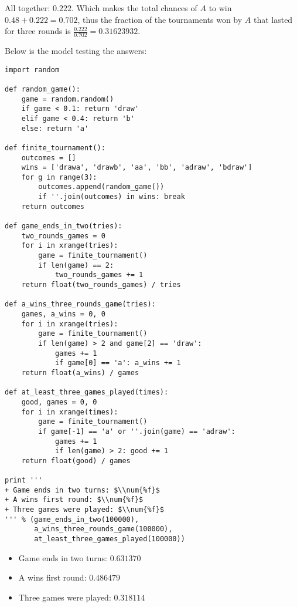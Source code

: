 \documentclass[11pt]{article}
\begin{document}
All together: $0.222$. Which makes the total chances of $A$ to win $0.48 +
    0.222 = 0.702$, thus the fraction of the tournaments won by $A$ that lasted
for three rounds is $\frac{0.222}{0.702} = \num{0.31623932}$.

Below is the model testing the answers:

\lstset{language=Python,numbers=none}
\begin{lstlisting}
import random

def random_game():
    game = random.random()
    if game < 0.1: return 'draw'
    elif game < 0.4: return 'b'
    else: return 'a'

def finite_tournament():
    outcomes = []
    wins = ['drawa', 'drawb', 'aa', 'bb', 'adraw', 'bdraw']
    for g in range(3):
        outcomes.append(random_game())
        if ''.join(outcomes) in wins: break
    return outcomes

def game_ends_in_two(tries):
    two_rounds_games = 0
    for i in xrange(tries):
        game = finite_tournament()
        if len(game) == 2:
            two_rounds_games += 1
    return float(two_rounds_games) / tries

def a_wins_three_rounds_game(tries):
    games, a_wins = 0, 0
    for i in xrange(tries):
        game = finite_tournament()
        if len(game) > 2 and game[2] == 'draw':
            games += 1
            if game[0] == 'a': a_wins += 1
    return float(a_wins) / games

def at_least_three_games_played(times):
    good, games = 0, 0
    for i in xrange(times):
        game = finite_tournament()
        if game[-1] == 'a' or ''.join(game) == 'adraw':
            games += 1
            if len(game) > 2: good += 1
    return float(good) / games

print '''
+ Game ends in two turns: $\\num{%f}$
+ A wins first round: $\\num{%f}$
+ Three games were played: $\\num{%f}$
''' % (game_ends_in_two(100000),
       a_wins_three_rounds_game(100000),
       at_least_three_games_played(100000))
\end{lstlisting}

\begin{itemize}
\item Game ends in two turns: $\num{0.631370}$
\item A wins first round: $\num{0.486479}$
\item Three games were played: $\num{0.318114}$
\end{itemize}
\end{document}
